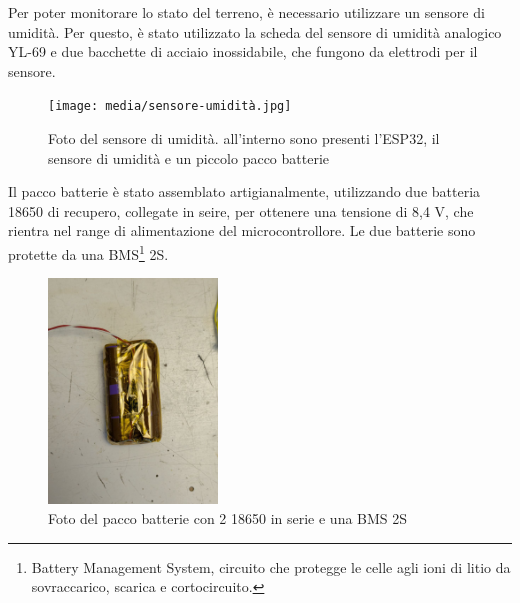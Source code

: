 \documentclass[11pt, a4paper]{article}
\begin{document}
Per poter monitorare lo stato del terreno, è necessario utilizzare un sensore di umidità.
Per questo, è stato utilizzato la scheda del sensore di umidità analogico YL-69 e due bacchette di acciaio
inossidabile, che fungono da elettrodi per il sensore.
\begin{figure}[H]
    \centering
    \texttt{[image: media/sensore-umidità.jpg]}
    \caption{Foto del sensore di umidità. all'interno sono presenti l'ESP32, il sensore di umidità
              e un piccolo pacco batterie}
    \label{fig:sensore-umidita}

\end{figure}
Il pacco batterie è stato assemblato artigianalmente, utilizzando due batteria 18650 di recupero,
collegate in seire, per ottenere una tensione di 8,4 V, che rientra nel range di alimentazione
del microcontrollore. Le due batterie sono protette da una 
BMS\footnote{Battery Management System, circuito che protegge le celle agli 
ioni di litio da sovraccarico, scarica e cortocircuito.} 2S.


\begin{figure}

    \centering
    \includegraphics[width=0.4\textwidth]{media/pacco-batterie-2s.jpg}
    \caption{Foto del pacco batterie con 2 18650 in serie e una BMS 2S}
    \label{fig:bms-2s}

\end{figure}
\end{document}
